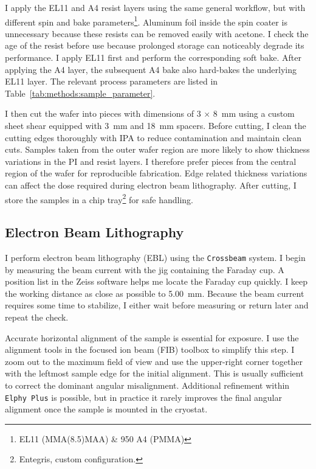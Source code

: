         I apply the EL11 and A4 resist layers using the same general workflow, but with different spin and bake parameters\footnote{EL11 (MMA(8.5)MAA) \& 950 A4 (PMMA)}. Aluminum foil inside the spin coater is unnecessary because these resists can be removed easily with acetone. I check the age of the resist before use because prolonged storage can noticeably degrade its performance. I apply EL11 first and perform the corresponding soft bake. After applying the A4 layer, the subsequent A4 bake also hard-bakes the underlying EL11 layer. The relevant process parameters are listed in Table~\ref{tab:methods:sample_parameter}.

        I then cut the wafer into pieces with dimensions of 3$\,\times\,$\qty{8}{\milli\meter} using a custom sheet shear equipped with \qty{3}{\milli\meter} and \qty{18}{\milli\meter} spacers. Before cutting, I clean the cutting edges thoroughly with IPA to reduce contamination and maintain clean cuts. Samples taken from the outer wafer region are more likely to show thickness variations in the PI and resist layers. I therefore prefer pieces from the central region of the wafer for reproducible fabrication. Edge related thickness variations can affect the dose required during electron beam lithography. After cutting, I store the samples in a chip tray\footnote{Entegris, custom configuration.} for safe handling.

    \subsection*{Electron Beam Lithography}

        I perform electron beam lithography (EBL) using the \texttt{Crossbeam} system. I begin by measuring the beam current with the jig containing the Faraday cup. A position list in the Zeiss software helps me locate the Faraday cup quickly. I keep the working distance as close as possible to \qty{5.00}{\milli\meter}. Because the beam current requires some time to stabilize, I either wait before measuring or return later and repeat the check.

        Accurate horizontal alignment of the sample is essential for exposure. I use the alignment tools in the focused ion beam (FIB) toolbox to simplify this step. I zoom out to the maximum field of view and use the upper-right corner together with the leftmost sample edge for the initial alignment. This is usually sufficient to correct the dominant angular misalignment. Additional refinement within \texttt{Elphy Plus} is possible, but in practice it rarely improves the final angular alignment once the sample is mounted in the cryostat.


